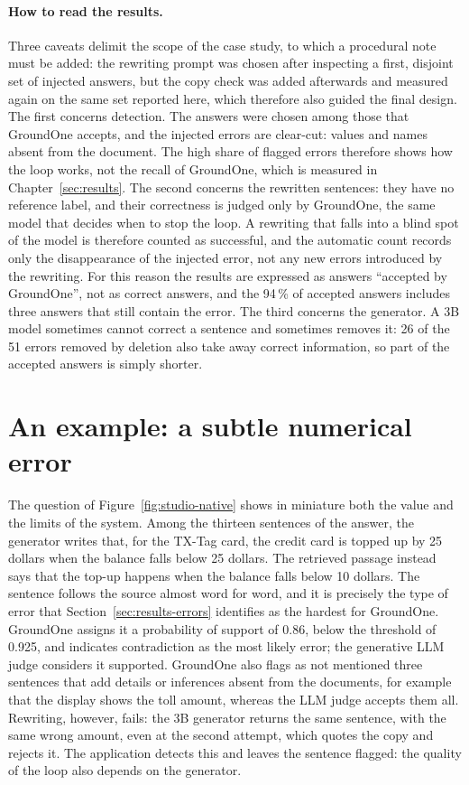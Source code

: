 \paragraph{How to read the results.} Three caveats delimit the scope of the case study, to which a procedural note must be added: the rewriting prompt was chosen after inspecting a first, disjoint set of injected answers, but the copy check was added afterwards and measured again on the same set reported here, which therefore also guided the final design. The first concerns detection.
The answers were chosen among those that GroundOne accepts, and the injected errors are clear-cut: values and names
absent from the document. The high share of flagged errors therefore shows how the loop works, not the recall of
GroundOne, which is measured in Chapter~\ref{sec:results}. The second concerns the rewritten sentences: they have no
reference label, and their correctness is judged only by GroundOne, the same model that decides when to stop the loop. A
rewriting that falls into a blind spot of the model is therefore counted as successful, and the automatic count records
only the disappearance of the injected error, not any new errors introduced by the rewriting. For this reason the
results are expressed as answers ``accepted by GroundOne'', not as correct answers, and the 94\,\% of accepted answers includes three answers that still contain the error. The third concerns the generator. A 3B model sometimes cannot
correct a sentence and sometimes removes it: 26 of the 51 errors removed by deletion also take away correct information,
so part of the accepted answers is simply shorter.

\section{An example: a subtle numerical error}
\label{sec:studio-example}

The question of Figure~\ref{fig:studio-native} shows in miniature both the value and the limits of the system. Among the
thirteen sentences of the answer, the generator writes that, for the TX-Tag card, the credit card is topped up by 25
dollars when the balance falls below 25 dollars. The retrieved passage instead says that the top-up happens when the
balance falls below 10 dollars. The sentence follows the source almost word for word, and it is precisely the type of
error that Section~\ref{sec:results-errors} identifies as the hardest for GroundOne. GroundOne assigns it a probability
of support of 0.86, below the threshold of 0.925, and indicates contradiction as the most likely error; the generative
LLM judge considers it supported. GroundOne also flags as not mentioned three sentences that add details or inferences
absent from the documents, for example that the display shows the toll amount, whereas the LLM judge accepts them all.
Rewriting, however, fails: the 3B generator returns the same sentence, with the same wrong amount, even at the second attempt, which quotes the copy and rejects it. The application detects this and leaves the sentence flagged: the quality of the loop also depends on the generator.

